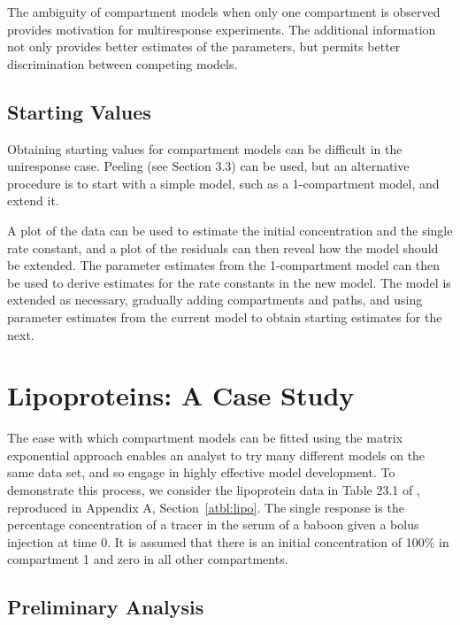 The ambiguity of compartment models when only one compartment is
observed provides motivation for multiresponse experiments.
The additional information not only provides better estimates of the
parameters, but permits better discrimination between competing
models.

\subsection{Starting Values}

Obtaining starting values for compartment models can be difficult
in the uniresponse case.
Peeling (see Section 3.3) can be used, but an alternative procedure is
to start with a simple model, such as a 1-compartment model, and extend it.

A plot of the data can be used to estimate the initial
concentration and the single rate constant, and a plot of the
residuals can then reveal how the model should be extended.
The parameter estimates from the 1-compartment model can then be used
to derive estimates for the rate constants in the new model.
The model is extended as necessary, gradually adding
compartments and paths, and using parameter estimates from
the current model to obtain starting estimates for the next.

\section{Lipoproteins:  A Case Study}

The ease with which compartment models can be fitted using the
matrix exponential approach enables an analyst to try many
different models on the same data set, and so engage in highly effective
model development.
To demonstrate this process, we consider the
lipoprotein data in Table 23.1 of , reproduced
in Appendix A, Section~\ref{atbl:lipo}.
The single response is the percentage concentration of a tracer in
the serum of a baboon given a bolus injection at time 0.
It is assumed that there is an initial concentration of 100\% in
compartment 1 and zero in all other compartments.

\subsection{Preliminary Analysis}

